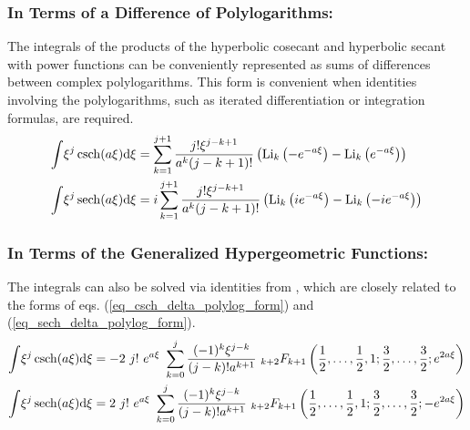 \subsubsection{In Terms of a Difference of Polylogarithms:}
The integrals of the products of the hyperbolic cosecant and hyperbolic secant with power functions can be conveniently represented as sums of differences between complex polylogarithms.  This form is convenient when identities involving the polylogarithms, such as
iterated differentiation or integration formulas, are required.
\begin{align}
	\int \! \xi^j \operatorname{csch}(a\xi) \mathrm{d}\xi &=
	    \sum_{k=1}^{j+1} \frac{j!\xi^{j-k+1}}{a^{k}(j-k+1)!} \left(
	        \operatorname{Li}_k\left(-e^{-a\xi}\right)
	      - \operatorname{Li}_k\left(e^{-a\xi}\right)\right) \label{eq_csch_delta_polylog_form}\\
	\int \! \xi^j \operatorname{sech}(a\xi) \mathrm{d}\xi &=
	i \sum_{k=1}^{j+1} \frac{j!\xi^{j-k+1}}{a^{k}(j-k+1)!} \left(
	\operatorname{Li}_k\left(i e^{-a\xi}\right)
	- \operatorname{Li}_k\left(-i e^{-a\xi}\right)\right) \label{eq_sech_delta_polylog_form}
\end{align}
\subsubsection{In Terms of the Generalized Hypergeometric Functions:}
The integrals can also be solved via identities from \cite{noauthor_hyperbolic_secant,noauthor_hyperbolic_cosecant}, which are closely related to the forms of eqs. (\ref{eq_csch_delta_polylog_form}) and (\ref{eq_sech_delta_polylog_form}).
\begin{align}
    \int \! \xi^j \operatorname{csch}(a\xi) \mathrm{d}\xi &=
	-2\ j!\ e^{a\xi}\ \sum_{k=0}^j \frac{(-1)^k \xi^{j-k}}{(j-k)! a^{k+1}}
	\ {}_{k+2}F_{k+1}\left(
	\frac12, \ldots, \frac12, 1;
	\frac32, \ldots, \frac32; e^{2 a \xi}
	\right) \\
	\int \! \xi^j \operatorname{sech}(a\xi) \mathrm{d}\xi &=
	2\ j!\ e^{a\xi}\ \sum_{k=0}^j \frac{(-1)^k \xi^{j-k}}{(j-k)! a^{k+1}}
	\ {}_{k+2}F_{k+1}\left(
	\frac12, \ldots, \frac12, 1;
	\frac32, \ldots, \frac32; -e^{2 a \xi}
	\right)
\end{align}
